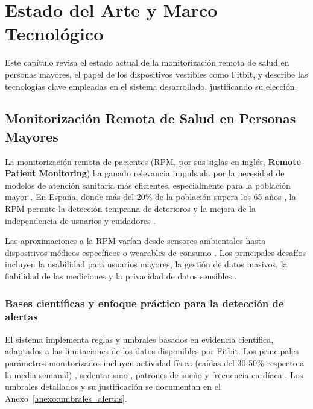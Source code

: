 \chapter{Estado del Arte y Marco Tecnológico}
\label{chap:estado_arte}

Este capítulo revisa el estado actual de la monitorización remota de salud en personas mayores, el papel de los dispositivos vestibles como Fitbit\textsuperscript{\textregistered}, y describe las tecnologías clave empleadas en el sistema desarrollado, justificando su elección.

\section{Monitorización Remota de Salud en Personas Mayores}
\label{sec:ea_monitorizacion_remota}

La monitorización remota de pacientes (RPM, por sus siglas en inglés, \textbf{Remote Patient Monitoring}) ha ganado relevancia impulsada por la necesidad de modelos de atención sanitaria más eficientes, especialmente para la población mayor \cite{noah2022mobile}. En España, donde más del 20\% de la población supera los 65 años \cite{ine_proyeccion_2022_2072}, la RPM permite la detección temprana de deterioros y la mejora de la independencia de usuarios y cuidadores \cite{bashshur2018telemedicine}.

Las aproximaciones a la RPM varían desde sensores ambientales hasta dispositivos médicos específicos o wearables de consumo \cite{majumder2017wearable}. Los principales desafíos incluyen la usabilidad para usuarios mayores, la gestión de datos masivos, la fiabilidad de las mediciones y la privacidad de datos sensibles \cite{lee2021challenges}.

\subsection{Bases científicas y enfoque práctico para la detección de alertas}
\label{subsec:bases_alertas}

El sistema implementa reglas y umbrales basados en evidencia científica, adaptados a las limitaciones de los datos disponibles por Fitbit. Los principales parámetros monitorizados incluyen actividad física (caídas del 30-50\% respecto a la media semanal) \cite{rebelo_physical_inactivity_consequences_2020, who_guidelines_2020}, sedentarismo \cite{bellettiere_pa_sedentary_aging_women_2017}, patrones de sueño \cite{nsf_older_adult_sleep_2022} y frecuencia cardíaca \cite{kang_hrv_thresholds_mortality_2021}. Los umbrales detallados y su justificación se documentan en el Anexo~\ref{anexo:umbrales_alertas}.


